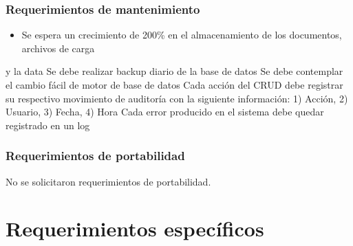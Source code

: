 \documentclass[letterpaper,10pt,spanish]{sphinxmanual}
\begin{document}
\subsection{Requerimientos de mantenimiento}
\label{\detokenize{SRS:requerimientos-de-mantenimiento}}\begin{itemize}
\item {} 
\sphinxAtStartPar
Se espera un crecimiento de 200\% en el almacenamiento de los documentos, archivos de carga

\end{itemize}

\sphinxAtStartPar
y la data
\sphinxhyphen{} Se debe realizar backup diario de la base de datos
\sphinxhyphen{} Se debe contemplar el cambio fácil de motor de base de datos
\sphinxhyphen{} Cada acción del CRUD debe registrar su respectivo movimiento de auditoría con la
siguiente información: 1) Acción, 2) Usuario, 3) Fecha, 4) Hora
\sphinxhyphen{} Cada error producido en el sistema debe quedar registrado en un log


\subsection{Requerimientos de portabilidad}
\label{\detokenize{SRS:requerimientos-de-portabilidad}}
\sphinxAtStartPar
No se solicitaron requerimientos de portabilidad.


\chapter{Requerimientos específicos}
\label{\detokenize{SRS:requerimientos-especificos}}
\end{document}
